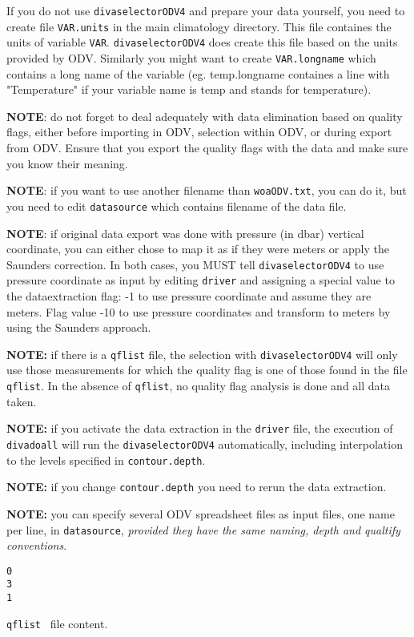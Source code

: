 \documentclass[8pt,a4paper,notitlepage]{book}
\begin{document}
If you do not use {\tt divaselectorODV4} and prepare your data yourself, you need to create  file {\tt VAR.units} in the main climatology directory. This file containes the units of variable {\tt VAR}. {\tt divaselectorODV4} does create this file based on the units provided by ODV. Similarly you might want to create {\tt VAR.longname} which contains a long name of the variable (eg. temp.longname containes a line with "Temperature" if your variable name is temp and stands for temperature).

{\bf NOTE}: do not forget to deal adequately with data elimination based on quality flags, either before importing in ODV, selection within ODV, or during export from ODV. Ensure that you export the quality flags with the data and make sure you know their meaning.

{\bf NOTE}: if you want to use another filename than {\tt woaODV.txt}, you can do it, but you need to edit {\tt datasource} which contains filename of the data file.

{\bf NOTE}: if original data export was done with pressure (in dbar) vertical coordinate, you can either chose to map it as if they were meters or apply the Saunders correction. In both cases, you MUST tell {\tt divaselectorODV4} to use pressure coordinate as input by editing {\tt driver} and assigning a special value to the dataextraction flag: -1 to use pressure coordinate and assume they are meters. Flag value -10 to use pressure coordinates and transform to meters by using the Saunders approach.


{\bf NOTE:} if there is a {\tt qflist} file, the selection with {\tt divaselectorODV4} will only use those measurements for which the quality flag is one of those found in the file {\tt qflist}. In the absence of {\tt qflist}, no quality flag analysis is done and all data taken.

{\bf NOTE:} if you activate the data extraction in the {\tt driver} file, the execution of {\tt divadoall} will run the {\tt divaselectorODV4} automatically, including interpolation to the levels specified in {\tt contour.depth}. 

{\bf NOTE:} if you change {\tt contour.depth} you need to rerun the data extraction.

{\bf NOTE:} you can specify several ODV spreadsheet files as input files, one name per line, in {\tt datasource}, {\it provided they have the same naming, depth and qualtify conventions}.
 
\begin{exfile}[H]
\begin{footnotesize}
\begin{verbatim}
0
3
1
\end{verbatim}
\end{footnotesize}
\caption{{\tt qflist } file content.} 
\end{exfile}
\end{document}
